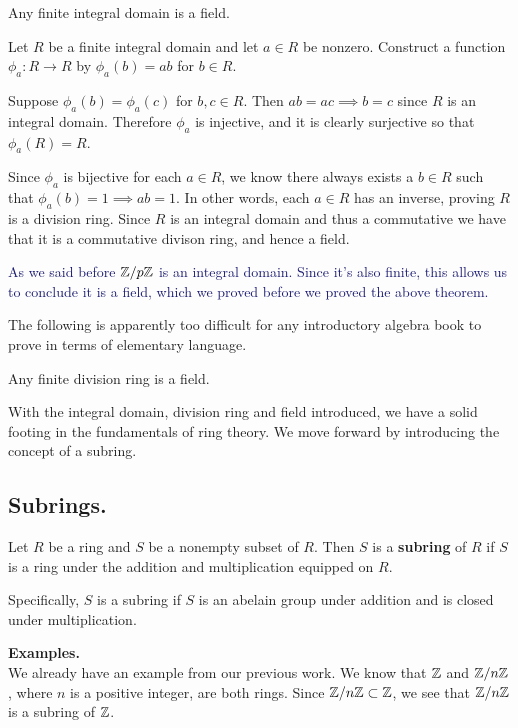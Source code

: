     \begin{thm}
        Any finite integral domain is a field.
    \end{thm}

    \begin{prf}
        Let $R$ be a finite integral domain and let $a \in R$ be nonzero.
        Construct a function $\phi_a: R \to R$ by $\phi_a(b) = ab$
        for $b \in R$. 

        Suppose $\phi_a(b) = \phi_a(c)$ for $b, c \in R$. Then $ab
        = ac \implies b = c$ since $R$ is an integral domain.
        Therefore $\phi_a$ is injective, and it is clearly
        surjective so that $\phi_a(R) = R$.
        
        Since $\phi_a$ is bijective for each $a \in R$, we know 
        there always exists a $b \in R$ such that $\phi_a(b) = 1
        \implies ab = 1$. In other words, each $a \in R$ has an
        inverse, proving $R$ is a division ring. Since $R$ is an
        integral domain and thus a commutative we have that it is a
        commutative divison ring, and hence a field.
    \end{prf}

    \textcolor{MidnightBlue}{As we said before $\mathbb{Z}/p\mathbb{Z}$ is an
    integral domain. Since it's also finite, this allows us to
    conclude it is a field, which we proved before we proved the
    above theorem.}

    The following is apparently too difficult for any
    introductory algebra book to prove in terms of elementary language.
    \begin{thm}
        Any finite division ring is a field.
    \end{thm}

    With the integral domain, division ring and field introduced,
    we have a solid footing in the fundamentals of ring theory. We
    move forward by introducing the concept of a subring.

    \subsection*{Subrings.}
    
    \begin{definition}
        Let $R$ be a ring and $S$ be a nonempty subset of $R$.
        Then $S$ is a \textbf{subring} of $R$ if $S$ is a ring under the
        addition and multiplication equipped on $R$. 

        Specifically, $S$ is a subring if $S$ is an abelain group
        under addition and is closed under multiplication.
    \end{definition}
    \noindent
    \textbf{Examples.}\\
    We already have an example from our previous work. We know
    that $\mathbb{Z}$ and $\mathbb{Z}/n\mathbb{Z}$, where $n$ is a positive integer,
    are both rings. Since $\mathbb{Z}/n\mathbb{Z} \subset \mathbb{Z}$, we see that
    $\mathbb{Z}/n\mathbb{Z}$ is a subring of $\mathbb{Z}$. 
    \\


